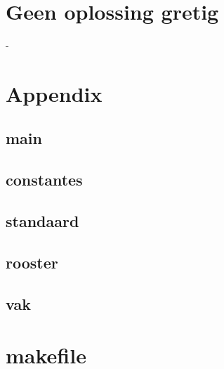 \documentclass{article}
\begin{document}
\section{Geen oplossing gretig}
-
\section{Appendix}
\subsection{main}

\subsection{constantes}

\subsection{standaard}


\subsection{rooster}


\subsection{vak}



\section{makefile}

\end{document}
